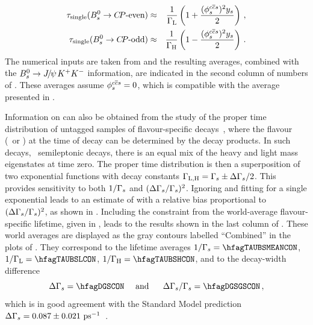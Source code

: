 \begin{eqnarray}
\tau_{\rm single}(\Bs \to \mbox{\CP-even})
& \approx & \frac{1}{\Gamma_{\rm L}} \left(1 + \frac{(\phiccbars)^2 y_s}{2} \right) \,,
\labe{tau_KK_approx}
\\
\tau_{\rm single}(\Bs \to \mbox{\CP-odd})
& \approx & \frac{1}{\Gamma_{\rm H}} \left(1 - \frac{(\phiccbars)^2 y_s}{2} \right) \,.
\labe{tau_Jpsif0_approx}
\end{eqnarray}
The numerical inputs are taken from 
and the resulting averages, combined with the $B^0_s\to{J\mskip -3mu/\mskip -2mu\psi\mskip 2mu} K^+K^-$ information,
are indicated in the second column of numbers of . 
These averages assume $\phiccbars = 0$, which is compatible with
the \phiccbars average presented in .

Information on \DGs can also be obtained from the study of the
proper time distribution of untagged samples
of flavour-specific \Bs decays~\cite{Hartkorn:1999ga}, where
the flavour (\ie\ \Bs or \Bsbar) at the time of decay can be determined by
the decay products. In such decays,
\eg\ semileptonic \Bs decays, there is
an equal mix of the heavy and light mass eigenstates at time zero.
The proper time distribution is then a superposition 
of two exponential functions with decay constants
$\Gamma_{\rm L,H} = \Gamma_{s} \pm \Delta\Gamma_{s}/2$.
This provides sensitivity to both $1/\Gamma_{s}$ and 
$(\Delta\Gamma_{s}/\Gamma_{s})^2$. Ignoring \DGs and fitting for 
a single exponential leads to an estimate of \Gs with a 
relative bias proportional to $(\Delta\Gamma_{s}/\Gamma_{s})^2$, as shown in . 
Including the constraint from the world-average flavour-specific \Bs 
lifetime, given in , leads to the results shown in the last column 
of .
These world averages are displayed as the gray contours labelled ``Combined'' in the
plots of . 
They correspond to the lifetime averages
$1/\Gs=\hfagTAUBSMEANCON$,
$1/\Gamma_{\rm L}=\hfagTAUBSLCON$,
$1/\Gamma_{\rm H}=\hfagTAUBSHCON$,
and to the decay-width difference
\begin{equation}
\DGs = \hfagDGSCON ~~~~\mbox{and} ~~~~~ \DGs/\Gs = \hfagDGSGSCON \,, 
\labe{DGs_DGsGs}
\end{equation}
which is in good agreement with the Standard Model prediction 
$\Delta\Gamma_{s} = 0.087 \pm 0.021~\hbox{ps}^{-1}$~\cite{Lenz:2011ti,*Lenz:2006hd}.

